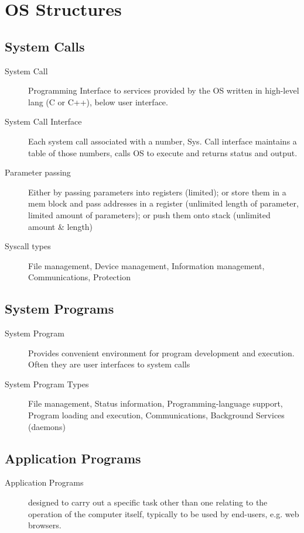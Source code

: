 \section*{OS Structures}

\subsection*{System Calls}
\begin{description}
    \item[System Call] Programming Interface to services provided by the OS written in high-level lang (C or C++), below user interface.
   \item[System Call Interface] Each system call associated with a number, Sys. Call interface maintains a table of those numbers, calls OS to execute and returns status and output.
   \item[Parameter passing] Either by passing parameters into registers (limited); or store them in a mem block and pass addresses in a register (unlimited length of parameter, limited amount of parameters); or push them onto stack (unlimited amount \& length)
  \item[Syscall types] File management, Device management, Information management, Communications, Protection

\end{description}

\subsection*{System Programs}
\begin{description}
  \item[System Program]Provides convenient environment for program development and execution. Often they are user interfaces to system calls
  \item[System Program Types] File management, Status information, Programming-language support, Program loading and execution, Communications, Background Services (daemons)
\end{description}

\subsection*{Application Programs}
\begin{description}
  \item[Application Programs]  designed to carry out a specific task other than one relating to the operation of the computer itself, typically to be used by end-users, e.g. web browsers.
\end{description}

